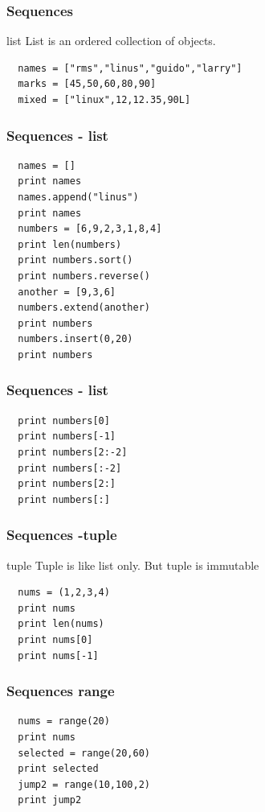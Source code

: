\documentclass{beamer}
\begin{document}
\begin{frame}[fragile]
 \frametitle{Sequences}
 \begin{block}{list}
  List is an ordered collection of objects.
 \end{block}
 \begin{verbatim}
  names = ["rms","linus","guido","larry"]
  marks = [45,50,60,80,90]
  mixed = ["linux",12,12.35,90L]
 \end{verbatim}
\end{frame}

\begin{frame}[fragile]
 \frametitle{Sequences - list}
 \begin{verbatim}
  names = []
  print names
  names.append("linus")
  print names
  numbers = [6,9,2,3,1,8,4]
  print len(numbers)
  print numbers.sort()
  print numbers.reverse()
  another = [9,3,6]
  numbers.extend(another)
  print numbers
  numbers.insert(0,20)
  print numbers
 \end{verbatim}

\end{frame}


\begin{frame}[fragile]
 \frametitle{Sequences - list}
 \begin{verbatim}
  print numbers[0]
  print numbers[-1]
  print numbers[2:-2]
  print numbers[:-2]
  print numbers[2:]
  print numbers[:]
 \end{verbatim}
\end{frame}

\begin{frame}[fragile]
 \frametitle{Sequences -tuple}
 \begin{block}{tuple}
  Tuple is like list only. But tuple is immutable
 \end{block}
 \begin{verbatim}
  nums = (1,2,3,4)
  print nums
  print len(nums)
  print nums[0]
  print nums[-1]
 \end{verbatim}
\end{frame}

\begin{frame}[fragile]
 \frametitle{Sequences range}
 \begin{verbatim}
  nums = range(20)
  print nums
  selected = range(20,60)
  print selected
  jump2 = range(10,100,2)
  print jump2
 \end{verbatim}

\end{frame}
\end{document}
